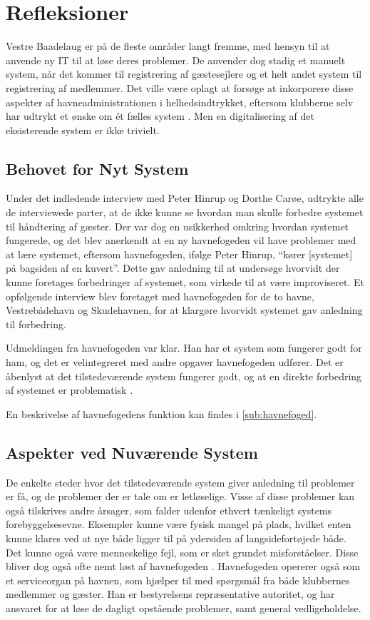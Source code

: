 \section{Refleksioner}
\label{sec:refleksioner}

Vestre Baadelaug er på de fleste områder langt fremme, med hensyn til at anvende ny IT til at løse deres problemer. De anvender dog stadig et manuelt system, når det kommer til registrering af gæstesejlere og et helt andet system til registrering af medlemmer. Det ville være oplagt at forsøge at inkorporere disse aspekter af havneadministrationen i helhedsindtrykket, eftersom klubberne selv har udtrykt et ønske om ét fælles system \cite{int_vb_sl}. Men en digitalisering af det eksisterende system er ikke trivielt.

\subsection{Behovet for Nyt System}

Under det indledende interview med Peter Hinrup og Dorthe Carøe, udtrykte alle de interviewede parter, at de ikke kunne se hvordan man skulle forbedre systemet til håndtering af gæster. Der var dog en usikkerhed omkring hvordan systemet fungerede, og det blev anerkendt at en ny havnefogeden vil have problemer med at lære systemet, eftersom havnefogeden, ifølge Peter Hinrup, \enquote{kører [systemet] på bagsiden af en kuvert}. Dette gav anledning til at undersøge hvorvidt der kunne foretages forbedringer af systemet, som virkede til at være improviseret. Et opfølgende interview blev foretaget med havnefogeden for de to havne, Vestrebådehavn og Skudehavnen, for at klargøre hvorvidt systemet gav anledning til forbedring.

Udmeldingen fra havnefogeden var klar. Han har et system som fungerer godt for ham, og det er velintegreret med andre opgaver havnefogeden udfører. Det er åbenlyst at det tilstedeværende system fungerer godt, og at en direkte forbedring af systemet er problematisk \cite{int_hf}. 

En beskrivelse af havnefogedens funktion kan findes i \cref{sub:havnefoged}.

\subsection{Aspekter ved Nuværende System}

De enkelte steder hvor det tilstedeværende system giver anledning til problemer er få, og de problemer der er tale om er letløselige. Visse af disse problemer kan også tilskrives andre årsager, som falder udenfor ethvert tænkeligt systems forebyggelsesevne. Eksempler kunne være fysisk mangel på plads, hvilket enten kunne klares ved at nye både ligger til på ydersiden af langsidefortøjede både. Det kunne også være menneskelige fejl, som er sket grundet misforståelser. Disse bliver dog også ofte nemt løst af havnefogeden \cite{int_hf}. Havnefogeden opererer også som et serviceorgan på havnen, som hjælper til med spørgsmål fra både klubbernes medlemmer og gæster. Han er bestyrelsens repræsentative autoritet, og har ansvaret for at løse de dagligt opstående problemer, samt general vedligeholdelse. 

